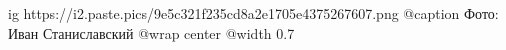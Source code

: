  
 
 
 
 

\ifcmt
  ig https://i2.paste.pics/9e5c321f235cd8a2e1705e4375267607.png
	@caption Фото: Иван Станиславский
  @wrap center
  @width 0.7
\fi
